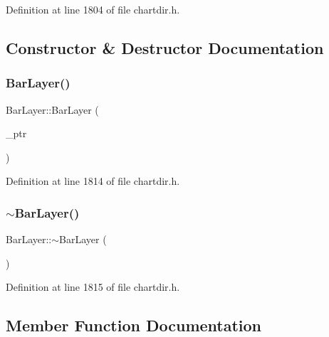 Definition at line 1804 of file chartdir.\+h.



\subsection{Constructor \& Destructor Documentation}
\mbox{\label{class_bar_layer_a836eab96793b97cf5a24a2ac35572e08}} 
\subsubsection{\texorpdfstring{Bar\+Layer()}{BarLayer()}}
{\footnotesize\ttfamily Bar\+Layer\+::\+Bar\+Layer (\begin{DoxyParamCaption}\item[{Bar\+Layer\+Internal $\ast$}]{\+\_\+ptr }\end{DoxyParamCaption})\hspace{0.3cm}{\ttfamily [inline]}}



Definition at line 1814 of file chartdir.\+h.

\mbox{\label{class_bar_layer_a96f156f33d31eb54fe766cecc2ce3c9d}} 
\subsubsection{\texorpdfstring{$\sim$\+Bar\+Layer()}{~BarLayer()}}
{\footnotesize\ttfamily Bar\+Layer\+::$\sim$\+Bar\+Layer (\begin{DoxyParamCaption}{ }\end{DoxyParamCaption})\hspace{0.3cm}{\ttfamily [inline]}}



Definition at line 1815 of file chartdir.\+h.



\subsection{Member Function Documentation}
\mbox{\label{class_bar_layer_a2452f8f6856168aa6e9997a56fff1a05}} 
